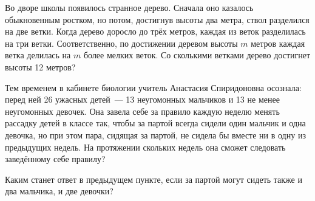 ﻿
\begin{itemize}

\itA Во дворе школы появилось странное дерево. Сначала оно казалось обыкновенным ростком, но потом, достигнув высоты два метра, ствол разделился на две ветки. Когда дерево доросло до трёх метров, каждая из веток разделилась на три ветки. Соответственно, по достижении деревом высоты $m$ метров каждая ветка делилась на $m$ более мелких веток. Со сколькими ветками дерево достигнет высоты 12 метров?

\itB Тем временем в кабинете биологии учитель Анастасия Спиридоновна осознала: перед ней 26 ужасных детей~— 13 неугомонных мальчиков и 13 не менее неугомонных девочек. Она завела себе за правило каждую неделю менять рассадку детей в классе так, чтобы за партой всегда сидели один мальчик и одна девочка, но при этом пара, сидящая за партой, не сидела бы вместе ни в одну из предыдущих недель. На протяжении скольких недель она сможет следовать заведённому себе правилу?

\itC Каким станет ответ в предыдущем пункте, если за партой могут сидеть также и два мальчика, и две девочки?
\end{itemize}